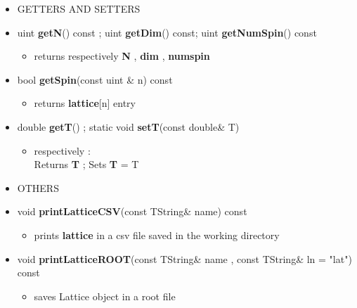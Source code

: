 \begin{itemize}
\begin{itemize}
		\item[] 
		GETTERS AND SETTERS \\
					
			\item[] uint \textbf{getN}() const ; uint \textbf{getDim}() const; uint \textbf{getNumSpin}() const 	
			\begin{itemize}
			\item[] returns respectively \textbf{N} , \textbf{dim} , \textbf{num\textunderscore spin} 
			\end{itemize}			
			
			\item[] bool \textbf{getSpin}(const uint \& n) const 		 
			\begin{itemize}
				\item[] returns \textbf{lattice}[n] entry
			\end{itemize}
					
			\item[] double \textbf{getT}() ; static void \textbf{setT}(const double\& \textunderscore T)	
			\begin{itemize}
				\item[] respectively : \\ 
						Returns \textbf{T} ; Sets \textbf{T} = \textunderscore T \\
			\end{itemize}
			
		\item[] 
		OTHERS \\
			
			\item[] void \textbf{printLatticeCSV}(const TString\& name) const		 
			\begin{itemize}
				\item[] prints \textbf{lattice} in a csv file saved in the working directory
			\end{itemize}
			
			\item[] 
			{\small			
			void \textbf{printLatticeROOT}(const TString\& name , const TString\& ln = "lat") const	
			}			
			\begin{itemize}
				\item[] saves Lattice object in a root file 
			\end{itemize}
			
	\end{itemize}

	
\end{itemize}

